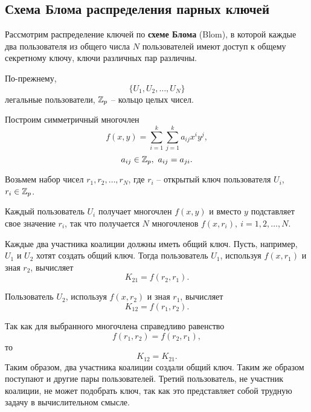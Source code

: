 \subsection{Схема Блома распределения парных ключей}

Рассмотрим распределение ключей по \textbf{схеме Блома} (Blom), в которой каждые два пользователя из общего числа $N$ пользователей имеют доступ к общему секретному ключу, ключи различных пар различны.

По-прежнему,
    \[ \{ U_1, U_2, \dots, U_N \} \]
легальные пользователи, $\mathbb{Z}_p$ -- кольцо целых чисел.

Построим симметричный многочлен
    \[ f(x,y) = \sum_{i=1}^k \sum_{j=1}^k a_{ij} x^i y^j, \]
    \[ a_{ij} \in \mathbb{Z}_p, ~ a_{ij} = a_{ji}. \]

Возьмем набор чисел $r_1, r_2, \dots, r_N$, где $r_i$ -- открытый ключ пользователя $U_i$, ~ $r_i \in \mathbb{Z}_p$.

Каждый пользователь $U_i$ получает многочлен $f(x,y)$ и вместо $y$ подставляет свое значение $r_i$, так что получается $N$ многочленов $f(x, r_i), ~ i = 1, 2, \dots, N$.

Каждые два участника коалиции должны иметь общий ключ. Пусть, например, $U_1$ и $U_2$ хотят создать общий ключ. Тогда пользователь $U_1$, используя $f(x, r_1)$ и зная $r_2$, вычисляет
    \[ K_{21} = f(r_2, r_1). \]

Пользователь $U_2$, используя $f(x, r_2)$ и зная $r_1$, вычисляет
    \[ K_{12} = f(r_1, r_2). \]

Так как для выбранного многочлена справедливо равенство
    \[ f(r_1, r_2) = f(r_2, r_1), \]
то
    \[ K_{12} = K_{21}. \]
Таким образом, два участника коалиции создали общий ключ. Таким же образом поступают и другие пары пользователей. Третий пользователь, не участник коалиции, не может подобрать ключ, так как это представляет собой трудную задачу в вычислительном смысле.


